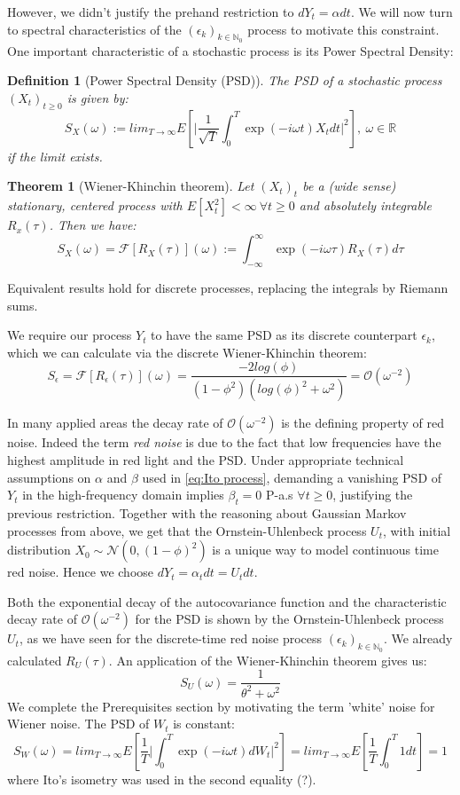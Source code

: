 \documentclass[%
thesis=student,%
coverpage=false,%
titlepage=false,%
headmarks=true, %
english,%
font=libertine, %
math=newpxtx, %
BCOR=5mm,%
coverBCOR=11mm%
]{tumbook}
\newtheorem{definition}{Definition}[section]
\newtheorem{theorem}{Theorem}
\begin{document}
However, we didn't justify the prehand restriction to $dY_{t} = \alpha dt$. We will now turn to spectral characteristics of the $(\epsilon_{k})_{k\in\mathbb{N}_{0}}$ process to motivate this constraint. One important characteristic of a stochastic process is its Power Spectral Density:


\begin{definition}[Power Spectral Density (PSD)]
The PSD of a stochastic process $(X_{t})_{t \geq 0}$ is given by:
\[
S_{X}(\omega) := lim_{T\rightarrow\infty}E[\lvert \frac{1}{\sqrt{T}}\int_{0}^{T}\exp(-i\omega t)X_{t}dt\rvert^{2}], \ \omega \in \mathbb{R}
\]
if the limit exists.
\end{definition}

\begin{theorem}[Wiener-Khinchin theorem]
Let $(X_{t})_{t}$ be a (wide sense) stationary, centered process with $E[X_{t}^2]<\infty \ \forall t \geq 0$ and absolutely integrable $R_{x}(\tau)$. Then we have:
\[
S_{X}(\omega) = \mathcal{F}[R_{X}(\tau)](\omega) := \int_{-\infty}^{\infty}\exp(-i\omega\tau)R_{X}(\tau)d\tau
\]
\end{theorem}

Equivalent results hold for discrete processes, replacing the integrals by Riemann sums.

We require our process $Y_{t}$ to have the same PSD as its discrete counterpart $\epsilon_{k}$, which we can calculate via the discrete Wiener-Khinchin theorem:
\[
S_{\epsilon} = \mathcal{F}[R_{\epsilon}(\tau)](\omega) = \frac{-2log(\phi)}{(1-\phi^{2})(log(\phi)^{2}+\omega^{2})} = \mathcal{O}(\omega^{-2})
\]

In many applied areas the decay rate of $\mathcal{O}(\omega^{-2})$ is the defining property of red noise. Indeed the term \textit{red noise} is due to the fact that low frequencies have the highest amplitude in red light and the PSD. 
Under appropriate technical assumptions on $\alpha$ and $\beta$ used in \ref{eq:Ito process}, demanding a vanishing PSD of $Y_{t}$ in the high-frequency domain implies $\beta_{t} = 0$ P-a.s $\forall t \geq 0$, justifying the previous restriction. Together with the reasoning about Gaussian Markov processes from above, we get that the Ornstein-Uhlenbeck process $U_{t}$, with initial distribution $X_{0} \sim \mathcal{N}(0,(1-\phi)^2)$ is a unique way to model continuous time red noise. Hence we choose $dY_{t} = \alpha_{t}dt = U_{t}dt$. 

Both the exponential decay of the autocovariance function and the characteristic decay rate of $\mathcal{O}(\omega^{-2})$ for the PSD is shown by the Ornstein-Uhlenbeck process $U_{t}$, as we have seen for the discrete-time red noise process $(\epsilon_{k})_{k\in\mathbb{N}_{0}}$. We already calculated $R_{U}(\tau)$. 
An application of the Wiener-Khinchin theorem gives us: 
\[
    S_{U}(\omega) = \frac{1}{\theta^{2} + \omega^{2}}
\]
We complete the Prerequisites section by motivating the term 'white' noise for Wiener noise. The PSD of $W_{t}$ is constant:
\[
S_{W}(\omega) =  lim_{T\rightarrow\infty}E[\frac{1}{T}\lvert\int_{0}^{T}\exp(-i\omega t)dW_{t}\rvert^{2}] = lim_{T\rightarrow \infty}E[\frac{1}{T}\int_{0}^{T}1dt] = 1
\]
where Ito's isometry was used in the second equality (?).
\end{document}
